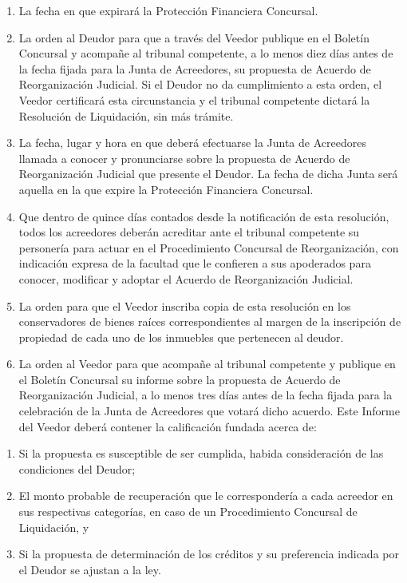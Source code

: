 \documentclass[
]{book}
\begin{document}
\begin{enumerate}
\def\labelenumi{\arabic{enumi})}
\setcounter{enumi}{2}
\item
  La fecha en que expirará la Protección Financiera Concursal.
\item
  La orden al Deudor para que a través del Veedor publique en el Boletín Concursal y acompañe al tribunal competente, a lo menos diez días antes de la fecha fijada para la Junta de Acreedores, su propuesta de Acuerdo de Reorganización Judicial. Si el Deudor no da cumplimiento a esta orden, el Veedor certificará esta circunstancia y el tribunal competente dictará la Resolución de Liquidación, sin más trámite.
\item
  La fecha, lugar y hora en que deberá efectuarse la Junta de Acreedores llamada a conocer y pronunciarse sobre la propuesta de Acuerdo de Reorganización Judicial que presente el Deudor. La fecha de dicha Junta será aquella en la que expire la Protección Financiera Concursal.
\item
  Que dentro de quince días contados desde la notificación de esta resolución, todos los acreedores deberán acreditar ante el tribunal competente su personería para actuar en el Procedimiento Concursal de Reorganización, con indicación expresa de la facultad que le confieren a sus apoderados para conocer, modificar y adoptar el Acuerdo de Reorganización Judicial.
\item
  La orden para que el Veedor inscriba copia de esta resolución en los conservadores de bienes raíces correspondientes al margen de la inscripción de propiedad de cada uno de los inmuebles que pertenecen al deudor.
\item
  La orden al Veedor para que acompañe al tribunal competente y publique en el Boletín Concursal su informe sobre la propuesta de Acuerdo de Reorganización Judicial, a lo menos tres días antes de la fecha fijada para la celebración de la Junta de Acreedores que votará dicho acuerdo. Este Informe del Veedor deberá contener la calificación fundada acerca de:
\end{enumerate}

\begin{enumerate}
\def\labelenumi{\alph{enumi})}
\item
  Si la propuesta es susceptible de ser cumplida, habida consideración de las condiciones del Deudor;
\item
  El monto probable de recuperación que le correspondería a cada acreedor en sus respectivas categorías, en caso de un Procedimiento Concursal de Liquidación, y
\item
  Si la propuesta de determinación de los créditos y su preferencia indicada por el Deudor se ajustan a la ley.
\end{enumerate}
\end{document}
